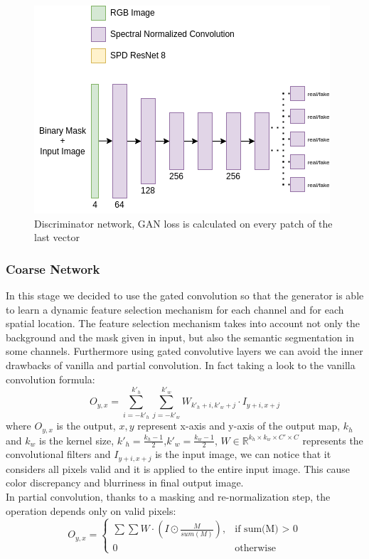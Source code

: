 \documentclass[10pt,twocolumn,letterpaper]{article}
\begin{document}
\begin{figure}
  \includegraphics[width=1\linewidth]{img/discriminator.png}
  \caption{Discriminator network, GAN loss is calculated on every patch of the
  last vector}
  \label{fig:discriminator}
\end{figure}
\subsubsection{Coarse Network}
In this stage we decided to use the gated convolution so that the generator is
able to learn a dynamic feature selection mechanism for each channel and for
each spatial location. The feature selection mechanism takes into account not
only the background and the mask given in input, but also the semantic
segmentation in some channels.
Furthermore using gated convolutive layers we can avoid the inner drawbacks of
vanilla and partial convolution. In fact taking a look to the vanilla
convolution formula:
\begin{dmath}
    O_{y,x} = \sum_{i=-k'_h}^{k'_h}\sum_{j=-k'_w}^{k'_w} W_{k'_h + i, k'_w + j} \cdot I_{y + i, x + j}
\end{dmath}
where \(O_{y,x}\) is the output, \(x,y\) represent x-axis and y-axis of the
output map, \(k_h\) and \(k_w\) is the kernel size, \(k'_h = \frac{k_h -
1}{2}\),\(k'_w = \frac{k_w - 1}{2}\), \(W \in \mathbb{R}^{k_h \times k_w \times
C' \times C}\) represents the convolutional filters and \(I_{y + i, x + j}\) is
the input image, we can notice that it considers all pixels valid and it is
applied to the entire input image. This cause color discrepancy and blurriness
in final output image.
\\
In partial convolution, thanks to a masking and re-normalization step, the
operation depends only on valid pixels:
\begin{dmath}
    O_{y,x} = \begin{cases}
    \sum \sum W \cdot (I \odot \frac{M}{sum(M)}), & \text{if sum(M) \(>\) 0} \\
      0 & \text{otherwise}
    \end{cases}
\end{dmath}
\end{document}

